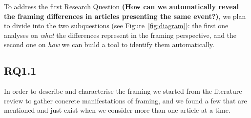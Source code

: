 To address the first Research Question
\textbf{(How can we automatically reveal the framing differences in articles presenting the same event?)}, we plan to divide into the two subquestions (see Figure~\ref{fig:diagram}): the first one analyses on \textit{what} the differences represent in the framing perspective, and the second one on \textit{how} we can build a tool to identify them automatically.




\subsection{RQ1.1}
In order to describe and characterise the framing we started from the literature review to gather concrete manifestations of framing, and we found a few that are mentioned and just exist when we consider more than one article at a time.

